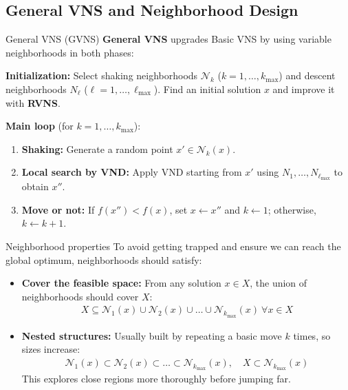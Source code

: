 \documentclass{beamer}
\begin{document}
\subsection{General VNS and Neighborhood Design}
\begin{frame}{General VNS (GVNS)}
\quad \textbf{General VNS} upgrades Basic VNS by using variable neighborhoods in both phases:

\vspace{0.2cm}
\textbf{Initialization:} Select shaking neighborhoods $\mathcal{N}_k$ ($k = 1, \dots, k_{\max}$) and descent neighborhoods $N_\ell$ ($\ell = 1, \dots, \ell_{\max}$). Find an initial solution $x$ and improve it with \textbf{RVNS}.

\vspace{0.2cm}
\textbf{Main loop} (for $k = 1, \dots, k_{\max}$):
\begin{enumerate}
\item \textbf{Shaking:} Generate a random point $x' \in \mathcal{N}_k(x)$.
\item \textbf{Local search by VND:} Apply VND starting from $x'$ using $N_1, \dots, N_{\ell_{\max}}$ to obtain $x''$.
\item \textbf{Move or not:} If $f(x'') < f(x)$, set $x \leftarrow x''$ and $k \leftarrow 1$; otherwise, $k \leftarrow k + 1$.
\end{enumerate}
\end{frame}

\begin{frame}{Neighborhood properties}
\quad To avoid getting trapped and ensure we can reach the global optimum, neighborhoods should satisfy:

\vspace{0.2cm}
\begin{itemize}
\item \textbf{Cover the feasible space:} From any solution $x \in X$, the union of neighborhoods should cover $X$:
\begin{gather*}
    X \subseteq \mathcal{N}_1(x) \cup \mathcal{N}_2(x) \cup \dots \cup \mathcal{N}_{k_{\max}}(x) \ \forall x \in X
\end{gather*}
\item \textbf{Nested structures:} Usually built by repeating a basic move $k$ times, so sizes increase:
\begin{gather*}
    \mathcal{N}_1(x) \subset \mathcal{N}_2(x) \subset \dots \subset \mathcal{N}_{k_{\max}}(x), \quad X \subset \mathcal{N}_{k_{\max}}(x)
\end{gather*}
This explores close regions more thoroughly before jumping far.
\end{itemize}
\end{frame}
\end{document}
